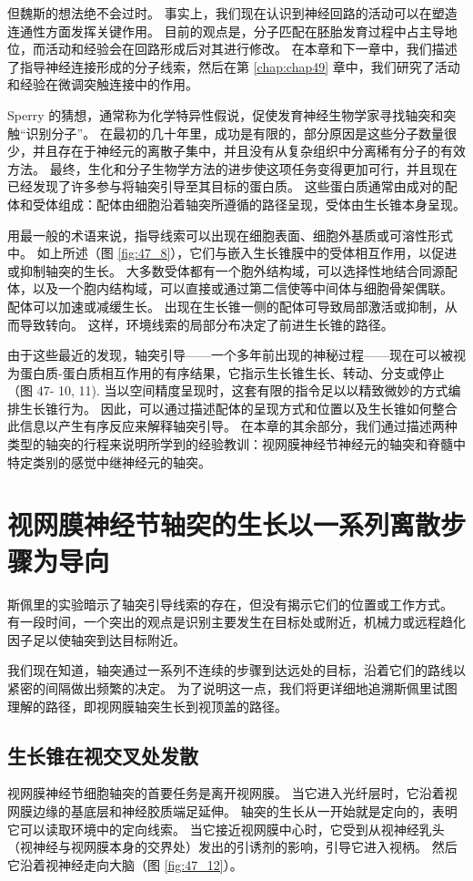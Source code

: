 但魏斯的想法绝不会过时。 事实上，我们现在认识到神经回路的活动可以在塑造连通性方面发挥关键作用。 目前的观点是，分子匹配在胚胎发育过程中占主导地位，而活动和经验会在回路形成后对其进行修改。 在本章和下一章中，我们描述了指导神经连接形成的分子线索，然后在第 \ref{chap:chap49} 章中，我们研究了活动和经验在微调突触连接中的作用。

Sperry 的猜想，通常称为化学特异性假说，促使发育神经生物学家寻找轴突和突触“识别分子”。 在最初的几十年里，成功是有限的，部分原因是这些分子数量很少，并且存在于神经元的离散子集中，并且没有从复杂组织中分离稀有分子的有效方法。 最终，生化和分子生物学方法的进步使这项任务变得更加可行，并且现在已经发现了许多参与将轴突引导至其目标的蛋白质。 这些蛋白质通常由成对的配体和受体组成：配体由细胞沿着轴突所遵循的路径呈现，受体由生长锥本身呈现。

用最一般的术语来说，指导线索可以出现在细胞表面、细胞外基质或可溶性形式中。 如上所述（图 \ref{fig:47_8}），它们与嵌入生长锥膜中的受体相互作用，以促进或抑制轴突的生长。 大多数受体都有一个胞外结构域，可以选择性地结合同源配体，以及一个胞内结构域，可以直接或通过第二信使等中间体与细胞骨架偶联。 配体可以加速或减缓生长。 出现在生长锥一侧的配体可导致局部激活或抑制，从而导致转向。 这样，环境线索的局部分布决定了前进生长锥的路径。

由于这些最近的发现，轴突引导——一个多年前出现的神秘过程——现在可以被视为蛋白质-蛋白质相互作用的有序结果，它指示生长锥生长、转动、分支或停止（图 47- 10, 11). 当以空间精度呈现时，这套有限的指令足以以精致微妙的方式编排生长锥行为。 因此，可以通过描述配体的呈现方式和位置以及生长锥如何整合此信息以产生有序反应来解释轴突引导。 在本章的其余部分，我们通过描述两种类型的轴突的行程来说明所学到的经验教训：视网膜神经节神经元的轴突和脊髓中特定类别的感觉中继神经元的轴突。


\section{视网膜神经节轴突的生长以一系列离散步骤为导向}
斯佩里的实验暗示了轴突引导线索的存在，但没有揭示它们的位置或工作方式。 有一段时间，一个突出的观点是识别主要发生在目标处或附近，机械力或远程趋化因子足以使轴突到达目标附近。

我们现在知道，轴突通过一系列不连续的步骤到达远处的目标，沿着它们的路线以紧密的间隔做出频繁的决定。 为了说明这一点，我们将更详细地追溯斯佩里试图理解的路径，即视网膜轴突生长到视顶盖的路径。

\subsection{生长锥在视交叉处发散}
视网膜神经节细胞轴突的首要任务是离开视网膜。 当它进入光纤层时，它沿着视网膜边缘的基底层和神经胶质端足延伸。 轴突的生长从一开始就是定向的，表明它可以读取环境中的定向线索。 
当它接近视网膜中心时，它受到从视神经乳头（视神经与视网膜本身的交界处）发出的引诱剂的影响，引导它进入视柄。 然后它沿着视神经走向大脑（图 \ref{fig:47_12}）。

